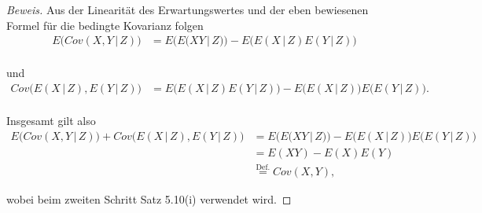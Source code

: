 \documentclass[10pt]{article}
\newcommand{\gap}{\,\vert\,}
\begin{document}
\begin{proof}[Beweis] Aus der Linearität des Erwartungswertes und der eben bewiesenen Formel für die bedingte Kovarianz folgen
	\begin{align*}
		E\big(Cov(X,Y \gap Z)\big) &= E\big( E\big( XY \gap Z \big) \big) - E\big(E(X \gap Z)E(Y \gap Z)\big) \\
	\end{align*}
	
	und
	\begin{align*}
		Cov\big(E(X \gap Z), E(Y \gap Z)\big) &= E\big(E(X \gap Z)E(Y \gap Z)\big) - E\big(E(X \gap Z)\big)E\big(E(Y \gap Z)\big). \\
	\end{align*}

	Insgesamt gilt also 
	\begin{align*}
		E\big(Cov(X,Y \gap Z)\big) + Cov\big(E(X \gap Z), E(Y \gap Z)\big) &= E\big( E\big( XY \gap Z \big) \big) - 
																			 E\big(E(X \gap Z)\big)E\big(E(Y \gap Z)\big)  \\
																		&= E(XY) - E(X)E(Y) 							  \\
																		&\overset{\text{Def.}}{=} Cov(X,Y),
	\end{align*}

	wobei beim zweiten Schritt Satz 5.10(i) verwendet wird.
\end{proof}
\end{document}
